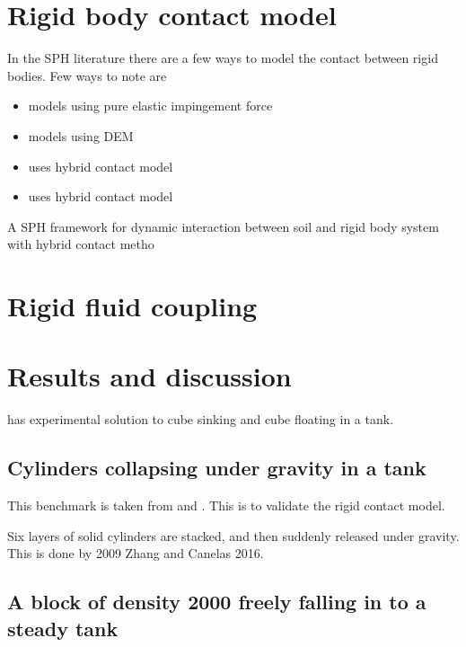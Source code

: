 \documentclass[preprint,12pt]{elsarticle}
\begin{document}
\section{Rigid body contact model}
\label{sec:rbd-contact-model}

In the SPH literature there are a few ways to model the contact
between rigid bodies. Few ways to note are

\begin{itemize}
\item \citet{albano2016modelling} models using pure elastic impingement force
\item \citet{choidevelopment} models using DEM
\item \citet{zhan2020sph} uses hybrid contact model
\item \citet{} uses hybrid contact model
\end{itemize}
A  SPH  framework  for  dynamic interaction  between  soil  and  rigid  body  system  with  hybrid contact   metho


\section{Rigid fluid coupling}
\label{sec:rf-coupling}




\section{Results and discussion}
\label{sec:results}
\citet{wu2014two} has experimental solution to cube sinking and cube floating
in a tank.

\subsection{Cylinders collapsing under gravity in a tank}
\label{sec:cylinders-collapsing-dem}

This benchmark is taken from \citet{chen2019coupled} and
\citet{wang2019numerical}. This is to validate the rigid contact model.

Six layers of solid cylinders are stacked, and then suddenly released under
gravity. This is done by 2009 Zhang and Canelas 2016.


\subsection{A block of density 2000 freely falling in to a steady tank}
\label{sec:2000-density-inside-tank}
\end{document}
